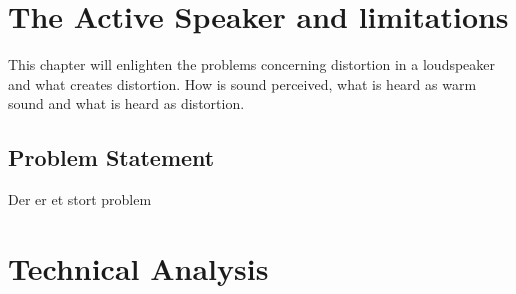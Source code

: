 


\chapter{The Active Speaker and limitations}

This chapter will enlighten the problems concerning distortion in a loudspeaker and what creates distortion. How is sound perceived, what is heard as warm sound and what is heard as distortion. 







\section{Problem Statement}

Der er et stort problem
\chapter{Technical Analysis}









